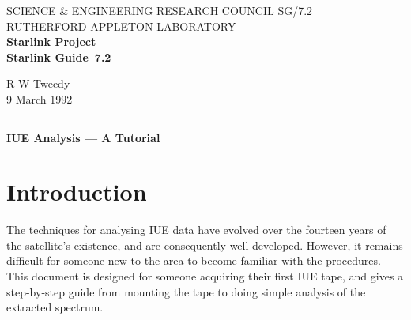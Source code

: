 \pagestyle{myheadings}

\newcommand{\stardoccategory}  {Starlink Guide}
\newcommand{\stardocinitials}  {SG}
\newcommand{\stardocnumber}    {7.2}
\newcommand{\stardocauthors}   {R W Tweedy}
\newcommand{\stardocdate}      {9 March 1992}
\newcommand{\stardoctitle}     {IUE Analysis --- A Tutorial}

\newcommand{\stardocname}{\stardocinitials /\stardocnumber}
\newcommand{\numcir}[1]{\mbox{\hspace{3ex}$\bigcirc$\hspace{-1.7ex}{\small #1}}}
\newcommand{\lsk}{\raisebox{-0.4ex}{\rm *}}
\renewcommand{\_}{{\tt\char'137}}     %
\markright{\stardocname}
\setlength{\textwidth}{160mm}
\setlength{\textheight}{230mm}
\setlength{\topmargin}{-2mm}
\setlength{\oddsidemargin}{0mm}
\setlength{\evensidemargin}{0mm}
\setlength{\parindent}{0mm}
\setlength{\parskip}{\medskipamount}
\setlength{\unitlength}{1mm}


\thispagestyle{empty}
SCIENCE \& ENGINEERING RESEARCH COUNCIL \hfill \stardocname\\
RUTHERFORD APPLETON LABORATORY\\
{\large\bf Starlink Project\\}
{\large\bf \stardoccategory\ \stardocnumber}
\begin{flushright}
\stardocauthors\\
\stardocdate
\end{flushright}
\vspace{-4mm}
\rule{\textwidth}{0.5mm}
\vspace{5mm}
\begin{center}
{\Large\bf \stardoctitle}
\end{center}
\vspace{5mm}

\setlength{\parskip}{0mm}
\tableofcontents
\setlength{\parskip}{\medskipamount}
\markright{\stardocname}

\newpage

\section{Introduction}

The techniques for analysing IUE data have evolved over the fourteen 
years of the satellite's existence, and are consequently well-developed. 
However, it remains difficult for someone new to the area to become familiar
with the procedures. This document is designed for someone acquiring their
first IUE tape, and gives a step-by-step guide from mounting the tape to 
doing simple analysis of the extracted spectrum. 


